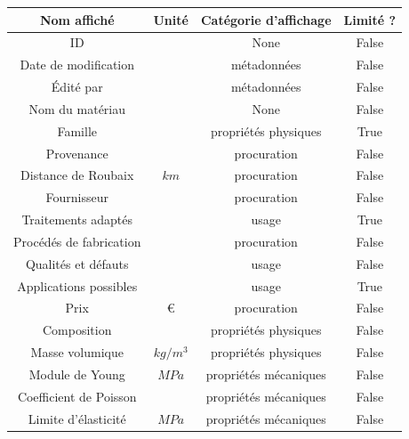 \documentclass[12pt,a4paper]{article}
\begin{document}
    \begin{table}
        \begin{center}
            \footnotesize
            \begin{tabular}{|c|c|c|c|}
                \hline
                Nom affiché & Unité & Catégorie d'affichage & Limité ? \\
                \hline
                ID &   & None & False \\
                \hline
                Date de modification &   & métadonnées & False \\
                \hline
                Édité par &   & métadonnées & False \\
                \hline
                Nom du matériau &   & None & False \\
                \hline
                Famille &   & propriétés physiques & True \\
                \hline
                Provenance &   & procuration & False \\
                \hline
                Distance de Roubaix & $km$ & procuration & False \\
                \hline
                Fournisseur &   & procuration & False \\
                \hline
                Traitements adaptés &   & usage & True \\
                \hline
                Procédés de fabrication &   & procuration & False \\
                \hline
                Qualités et défauts &   & usage & False \\
                \hline
                Applications possibles &   & usage & True \\
                \hline
                Prix & $\euro$ & procuration & False \\
                \hline
                Composition &   & propriétés physiques & False \\
                \hline
                Masse volumique & $kg/m^{3}$ & propriétés physiques & False \\
                \hline
                Module de Young & $MPa$ & propriétés mécaniques & False \\
                \hline
                Coefficient de Poisson &   & propriétés mécaniques & False \\
                \hline
                Limite d'élasticité & $MPa$ & propriétés mécaniques & False \\

\end{tabular}
\end{center}
\end{table}
\end{document}

